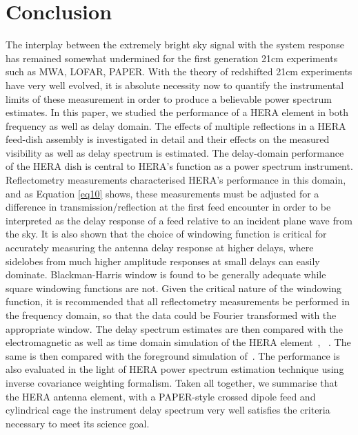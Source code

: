\documentclass[twocolumn]{emulateapj}
\begin{document}
\section{\textbf{Conclusion}}
The interplay between the extremely bright sky signal with the system response has remained somewhat undermined for the first generation 21cm experiments such as MWA, LOFAR, PAPER. With the theory of redshifted 21cm experiments have very well evolved, it is absolute necessity now to quantify the instrumental limits of these measurement in order to produce a believable power spectrum estimates.
In this paper, we studied the performance of a HERA element in both frequency as well as delay domain. The effects of multiple reflections  in a HERA feed-dish assembly is investigated in detail and their effects on the measured visibility as well as delay spectrum is estimated.  The delay-domain performance of the HERA dish is central to HERA's function as a power spectrum instrument. Reflectometry measurements characterised HERA's performance in this domain, and as Equation \ref{eq10} shows, these measurements must be adjusted for a difference in transmission/reflection
at the first feed encounter in order to be interpreted as the delay response of a feed relative to an incident
plane wave from the sky.  It is also shown that the choice of windowing function is critical for accurately measuring the
antenna delay response at higher delays, where sidelobes from much higher amplitude responses at small delays can easily
dominate.  Blackman-Harris window is found to be generally adequate while square windowing functions are not.
Given the critical nature of the windowing function, it is recommended that all reflectometry measurements be performed in the
frequency domain, so that the data could be Fourier transformed with the appropriate window.
The delay spectrum estimates are then compared with the electromagnetic as well as time domain simulation of the HERA element~\citep{Ewall-Wice_et_al2016}, ~\citep{ddboer_et_al2016}. The same is then compared with the foreground simulation of~\cite{Thyagarajan_et_al2015}. The performance is also evaluated in the light of HERA power spectrum estimation technique using inverse covariance weighting formalism. 
Taken all together, we summarise that the HERA antenna element, with a PAPER-style crossed dipole feed and cylindrical cage the instrument delay spectrum very well satisfies the criteria necessary to meet its science goal. 


{}
\end{document}

